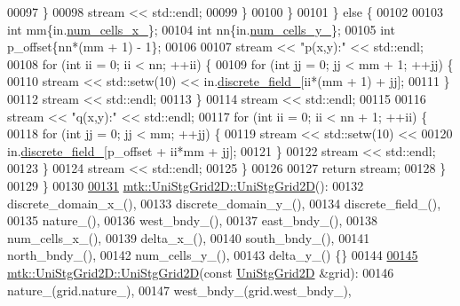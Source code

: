 \begin{DoxyCode}
00097         \}
00098         stream << std::endl;
00099       \}
00100     \}
00101   \} \textcolor{keywordflow}{else} \{
00102 
00103     \textcolor{keywordtype}{int} mm\{in.\hyperlink{classmtk_1_1UniStgGrid2D_ac03a0f4840ee6ae1bc853e5d9c0df8d1}{num\_cells\_x\_}\};
00104     \textcolor{keywordtype}{int} nn\{in.\hyperlink{classmtk_1_1UniStgGrid2D_a3e4f61d781212ad57c34e9446c4074b6}{num\_cells\_y\_}\};
00105     \textcolor{keywordtype}{int} p\_offset\{nn*(mm + 1) - 1\};
00106 
00107     stream << \textcolor{stringliteral}{"p(x,y):"} << std::endl;
00108     \textcolor{keywordflow}{for} (\textcolor{keywordtype}{int} ii = 0; ii < nn; ++ii) \{
00109       \textcolor{keywordflow}{for} (\textcolor{keywordtype}{int} jj = 0; jj < mm + 1; ++jj) \{
00110         stream << std::setw(10) << in.\hyperlink{classmtk_1_1UniStgGrid2D_ad7474b2669ee988b84aed20b7f5dc7be}{discrete\_field\_}[ii*(mm + 1) + jj];
00111       \}
00112       stream << std::endl;
00113     \}
00114     stream << std::endl;
00115 
00116     stream << \textcolor{stringliteral}{"q(x,y):"} << std::endl;
00117     \textcolor{keywordflow}{for} (\textcolor{keywordtype}{int} ii = 0; ii < nn + 1; ++ii) \{
00118       \textcolor{keywordflow}{for} (\textcolor{keywordtype}{int} jj = 0; jj < mm; ++jj) \{
00119         stream << std::setw(10) <<
00120           in.\hyperlink{classmtk_1_1UniStgGrid2D_ad7474b2669ee988b84aed20b7f5dc7be}{discrete\_field\_}[p\_offset + ii*mm + jj];
00121       \}
00122       stream << std::endl;
00123     \}
00124     stream << std::endl;
00125   \}
00126 
00127   \textcolor{keywordflow}{return} stream;
00128 \}
00129 \}
00130 
\hypertarget{mtk__uni__stg__grid__2d_8cc_source_l00131}{}\hyperlink{classmtk_1_1UniStgGrid2D_a40db9a6d21e0f4cf70c478fcc3b94531}{00131} \hyperlink{classmtk_1_1UniStgGrid2D_a40db9a6d21e0f4cf70c478fcc3b94531}{mtk::UniStgGrid2D::UniStgGrid2D}():
00132     discrete\_domain\_x\_(),
00133     discrete\_domain\_y\_(),
00134     discrete\_field\_(),
00135     nature\_(),
00136     west\_bndy\_(),
00137     east\_bndy\_(),
00138     num\_cells\_x\_(),
00139     delta\_x\_(),
00140     south\_bndy\_(),
00141     north\_bndy\_(),
00142     num\_cells\_y\_(),
00143     delta\_y\_() \{\}
00144 
\hypertarget{mtk__uni__stg__grid__2d_8cc_source_l00145}{}\hyperlink{classmtk_1_1UniStgGrid2D_aab6e54b48c3f32de808460ef46f598d4}{00145} \hyperlink{classmtk_1_1UniStgGrid2D_a40db9a6d21e0f4cf70c478fcc3b94531}{mtk::UniStgGrid2D::UniStgGrid2D}(\textcolor{keyword}{const} 
      \hyperlink{classmtk_1_1UniStgGrid2D}{UniStgGrid2D} &grid):
00146     nature\_(grid.nature\_),
00147     west\_bndy\_(grid.west\_bndy\_),

\end{DoxyCode}
